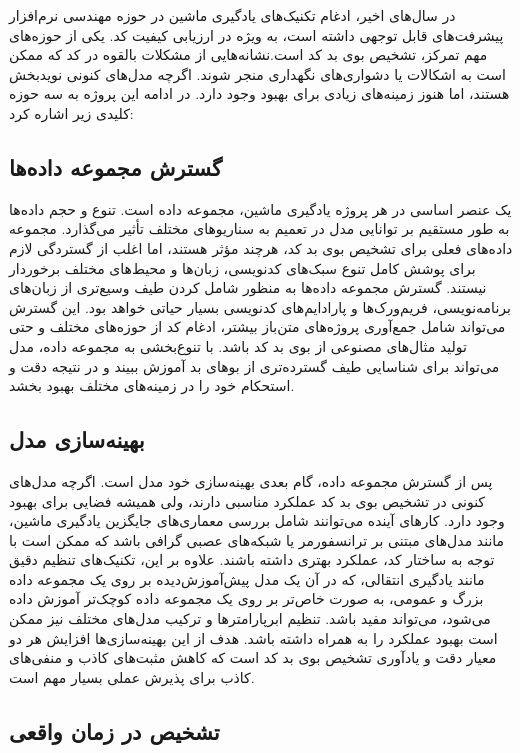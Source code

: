 در سال‌های اخیر، ادغام تکنیک‌های یادگیری ماشین در حوزه مهندسی نرم‌افزار پیشرفت‌های قابل توجهی داشته است، به ویژه در ارزیابی کیفیت کد. یکی از حوزه‌های مهم تمرکز، تشخیص بوی بد کد است.نشانه‌هایی از مشکلات بالقوه در کد که ممکن است به اشکالات یا دشواری‌های نگهداری منجر شوند. اگرچه مدل‌های کنونی نویدبخش هستند، اما هنوز زمینه‌های زیادی برای بهبود وجود دارد. در ادامه این پروژه به سه حوزه کلیدی زیر اشاره کرد:

\subsection{گسترش مجموعه داده‌ها}
یک عنصر اساسی در هر پروژه یادگیری ماشین، مجموعه داده است. تنوع و حجم داده‌ها به طور مستقیم بر توانایی مدل در تعمیم به سناریوهای مختلف تأثیر می‌گذارد. مجموعه داده‌های فعلی برای تشخیص بوی بد کد، هرچند مؤثر هستند، اما اغلب از گستردگی لازم برای پوشش کامل تنوع سبک‌های کدنویسی، زبان‌ها و محیط‌های مختلف برخوردار نیستند. گسترش مجموعه داده‌ها به منظور شامل کردن طیف وسیع‌تری از زبان‌های برنامه‌نویسی، فریم‌ورک‌ها و پارادایم‌های کدنویسی بسیار حیاتی خواهد بود. این گسترش می‌تواند شامل جمع‌آوری پروژه‌های متن‌باز بیشتر، ادغام کد از حوزه‌های مختلف و حتی تولید مثال‌های مصنوعی از بوی بد کد باشد. با تنوع‌بخشی به مجموعه داده، مدل می‌تواند برای شناسایی طیف گسترده‌تری از بوهای بد آموزش ببیند و در نتیجه دقت و استحکام خود را در زمینه‌های مختلف بهبود بخشد.

\subsection{بهینه‌سازی مدل}

پس از گسترش مجموعه داده، گام بعدی بهینه‌سازی خود مدل است. اگرچه مدل‌های کنونی در تشخیص بوی بد کد عملکرد مناسبی دارند، ولی همیشه فضایی برای بهبود وجود دارد. کارهای آینده می‌توانند شامل بررسی معماری‌های جایگزین یادگیری ماشین، مانند مدل‌های مبتنی بر ترانسفورمر یا شبکه‌های عصبی گرافی باشد که ممکن است با توجه به ساختار کد، عملکرد بهتری داشته باشند. علاوه بر این، تکنیک‌های تنظیم دقیق مانند یادگیری انتقالی، که در آن یک مدل پیش‌آموزش‌دیده بر روی یک مجموعه داده بزرگ و عمومی، به صورت خاص‌تر بر روی یک مجموعه داده کوچک‌تر آموزش داده می‌شود، می‌تواند مفید باشد. تنظیم ابرپارامترها و ترکیب مدل‌های مختلف نیز ممکن است بهبود عملکرد را به همراه داشته باشد. هدف از این بهینه‌سازی‌ها افزایش هر دو معیار دقت و یادآوری تشخیص بوی بد کد است که کاهش مثبت‌های کاذب و منفی‌های کاذب برای پذیرش عملی بسیار مهم است.

\subsection{تشخیص در زمان واقعی}

